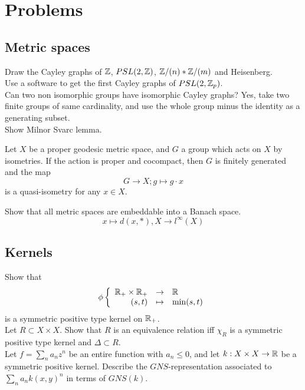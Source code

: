 \newpage
\section{Problems}

\subsection{Metric spaces}
Draw the Cayley graphs of $\mathbb Z$, $PSL(2,\mathbb Z)$, $\mathbb Z / (n) \ast \mathbb Z / (m)$ and Heisenberg.\\

Use a software to get the first Cayley graphs of $PSL(2,\mathbb Z_p)$.\\

Can two non isomorphic groups have isomorphic Cayley graphs? Yes, take two finite groups of same cardinality, and use the whole group minus the identity as a generating subset.\\

Show Milnor Svarc lemma.\\

\begin{thm}
Let $X$ be a proper geodesic metric space, and $G$ a group which acts on $X$ by isometries. If the action is proper and cocompact, then $G$ is finitely generated and the map
\[G \rightarrow X ; g\mapsto g\cdot x\]
is a quasi-isometry for any $x\in X$.
\end{thm}

Show that all metric spaces are embeddable into a Banach space. 
\[x\mapsto d(x, *), X\rightarrow l^\infty (X)\]

\subsection{Kernels}

Show that \[\phi \left\{\begin{array}{rcl} \mathbb R_+ \times \mathbb R_+ & \rightarrow & \mathbb R \\ (s,t) & \mapsto & \min(s,t)\end{array}\right.\]
is a symmetric positive type kernel on $\mathbb R_+$.\\

Let $R\subset X\times X$. Show that $R$ is an equivalence relation iff $\chi_R$ is a symmetric positive type kernel and $\Delta\subset R$.\\
 
Let $f=\sum_n a_n z^n$ be an entire function with $a_n\leq 0$, and let $k: X\times X\rightarrow \mathbb R$ be a symmetric positive kernel. Describe the $GNS$-representation associated to $\sum_n a_n k(x,y)^n$ in terms of $GNS(k)$.\\

